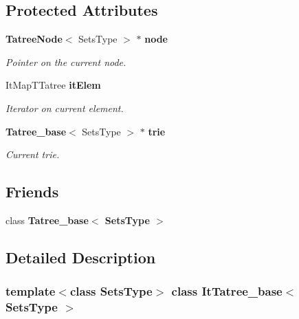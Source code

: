 \subsection*{Protected Attributes}
\begin{CompactItemize}
\item 
{\bf Tatree\-Node}$<$ Sets\-Type $>$ $\ast$ {\bf node}\label{class_it_tatree__base_160cdf6cedc88b43a6bd05ad56f768cc}

\begin{CompactList}\small\item\em Pointer on the current node. \item\end{CompactList}\item 
It\-Map\-TTatree {\bf it\-Elem}\label{class_it_tatree__base_2c03dbde18a7eceb7821084245eca38f}

\begin{CompactList}\small\item\em Iterator on current element. \item\end{CompactList}\item 
{\bf Tatree\_\-base}$<$ Sets\-Type $>$ $\ast$ {\bf trie}\label{class_it_tatree__base_a441b943cb27a2ecf58c394853213215}

\begin{CompactList}\small\item\em Current trie. \item\end{CompactList}\end{CompactItemize}
\subsection*{Friends}
\begin{CompactItemize}
\item 
class {\bf Tatree\_\-base$<$ Sets\-Type $>$}\label{class_it_tatree__base_4d067db2add706706c659a83c3cbcf41}

\end{CompactItemize}


\subsection{Detailed Description}
\subsubsection*{template$<$class Sets\-Type$>$ class It\-Tatree\_\-base$<$ Sets\-Type $>$}

